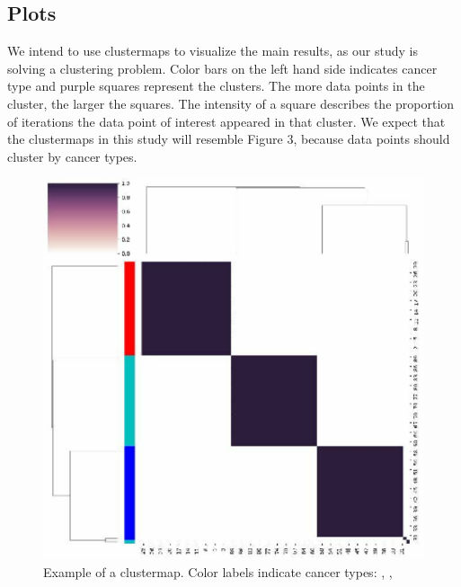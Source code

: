 \documentclass{article}
\begin{document}
\subsection{Plots}
We intend to use clustermaps to visualize the main results, as our study is solving a clustering problem. Color bars on the left hand side indicates cancer type and purple squares represent the clusters. The more data points in the cluster, the larger the squares. The intensity of a square describes the proportion of iterations the data point of interest appeared in that cluster. We expect that the clustermaps in this study will resemble Figure 3, because data points should cluster by cancer types.

\begin{figure}[!htp]
	\centering
	\includegraphics[scale=0.3]{figures/example_clustermap.pdf}
	\caption{Example of a clustermap. Color labels indicate cancer types: \color{red}{Type I}, \color{blue}{Type II}, \color{cyan}{Type III}}
\end{figure}
\end{document}
